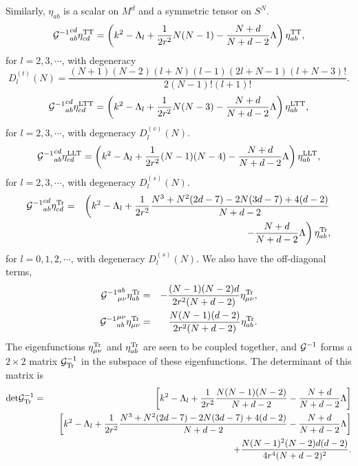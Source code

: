 \documentclass[a4paper,aps,preprint,groupedaddress,showpacs]{revtex4}
\begin{document}
Similarly, $\eta_{ab}$ is a scalar on $M^{d}$ and a symmetric tensor
on $S^{N}$. 
\begin{equation}
{{\cal G}^{-1}}^{cd}_{ab}\eta^{\rm TT}_{cd}=
\left(k^{2}-\Lambda_{l}+\frac{1}{2r^{2}}N(N-1)-
\frac{N+d}{N+d-2}\Lambda\right)\eta^{\rm TT}_{ab},
\end{equation}
for $l=2,3,\cdots$, with degeneracy
\begin{equation}
D^{(t)}_{l}(N)=
\frac{(N+1)(N-2)(l+N)(l-1)(2l+N-1)(l+N-3)!}{2(N-1)!(l+1)!}.
\end{equation}
\begin{equation}
{{\cal G}^{-1}}^{cd}_{ab}\eta^{\rm LTT}_{cd}=
\left(k^{2}-\Lambda_{l}+\frac{1}{2r^{2}}N(N-3)-
\frac{N+d}{N+d-2}\Lambda\right)\eta^{\rm LTT}_{ab},
\end{equation}
for $l=2,3,\cdots$, with degeneracy $D^{(v)}_{l}(N)$.
\begin{equation}
{{\cal G}^{-1}}^{cd}_{ab}\eta^{\rm LLT}_{cd}=
\left(k^{2}-\Lambda_{l}+\frac{1}{2r^{2}}(N-1)(N-4)-
\frac{N+d}{N+d-2}\Lambda\right)\eta^{\rm LLT}_{ab},
\end{equation}
for $l=2,3,\cdots$, with degeneracy $D^{(s)}_{l}(N)$.
\begin{eqnarray}
{{\cal G}^{-1}}^{cd}_{ab}\eta^{\rm Tr}_{cd}&=&
\left(k^{2}-\Lambda_{l}+\frac{1}{2r^{2}}
\frac{N^{3}+N^{2}(2d-7)-2N(3d-7)+4(d-2)}{N+d-2}\right.
\nonumber\\
&&\ \ \left.-\frac{N+d}{N+d-2}\Lambda\right)\eta^{\rm Tr}_{ab},
\end{eqnarray}
for $l=0,1,2,\cdots$, with degeneracy $D^{(s)}_{l}(N)$.
We also have the off-diagonal terms, 
\begin{eqnarray}
{{\cal G}^{-1}}^{ab}_{\mu\nu}\eta^{\rm Tr}_{ab}
&=&-\frac{(N-1)(N-2)d}{2r^{2}(N+d-2)}\eta^{\rm Tr}_{\mu\nu},
\\
{{\cal G}^{-1}}^{\mu\nu}_{ab}\eta^{\rm Tr}_{\mu\nu}
&=&\frac{N(N-1)(d-2)}{2r^{2}(N+d-2)}\eta^{\rm Tr}_{ab}.
\end{eqnarray}
The eigenfunctions $\eta^{\rm Tr}_{\mu\nu}$ and 
$\eta^{\rm Tr}_{ab}$ are seen to be coupled together, and 
${\cal G}^{-1}$ 
forms a $2\times 2$ matrix ${\cal G}^{-1}_{\rm Tr}$
in the subspace of these eigenfunctions. 
The determinant of this matrix is
\begin{eqnarray}
{\rm det}{\cal G}^{-1}_{\rm Tr}
&=&\left[k^{2}-\Lambda_{l}+\frac{1}{2r^{2}}
\frac{N(N-1)(N-2)}{N+d-2}-\frac{N+d}{N+d-2}\Lambda\right]
\nonumber\\
&&\ \ 
\left[k^{2}-\Lambda_{l}+\frac{1}{2r^{2}}
\frac{N^{3}+N^{2}(2d-7)-2N(3d-7)+4(d-2)}{N+d-2}-
\frac{N+d}{N+d-2}\Lambda\right]
\nonumber\\
&&\ \ +\frac{N(N-1)^{2}(N-2)d(d-2)}{4r^{4}(N+d-2)^{2}}.
\label{det}
\end{eqnarray}
\end{document}

